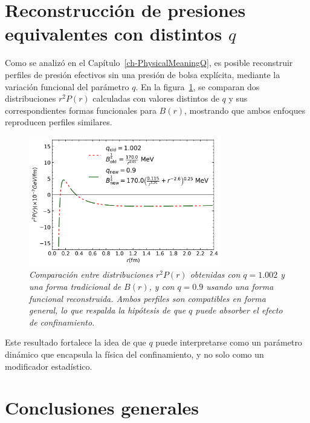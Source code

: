 \section{Reconstrucción de presiones equivalentes con distintos \( q \)}

Como se analizó en el Capítulo~\ref{ch-PhysicalMeaningQ}, es posible reconstruir perfiles de presión efectivos sin una presión de bolsa explícita, mediante la variación funcional del parámetro \( q \). En la figura~\ref{fig:B_reconstructed_combined}, se comparan dos distribuciones \( r^2 P(r) \) calculadas con valores distintos de \( q \) y sus correspondientes formas funcionales para \( B(r) \), mostrando que ambos enfoques reproducen perfiles similares.

\begin{figure}[H]
    \centering
    \includegraphics[width=0.75\textwidth]{./Images/Comparacion_B_old_new_combined.png}
    \caption[Comparación de perfiles con distintos \( q \)]{\emph{Comparación entre distribuciones \( r^2 P(r) \) obtenidas con \( q = 1.002 \) y una forma tradicional de \( B(r) \), y con \( q = 0.9 \) usando una forma funcional reconstruida. Ambos perfiles son compatibles en forma general, lo que respalda la hipótesis de que \( q \) puede absorber el efecto de confinamiento.}}
    \label{fig:B_reconstructed_combined}
\end{figure}

Este resultado fortalece la idea de que \( q \) puede interpretarse como un parámetro dinámico que encapsula la física del confinamiento, y no solo como un modificador estadístico.

\section{Conclusiones generales}


